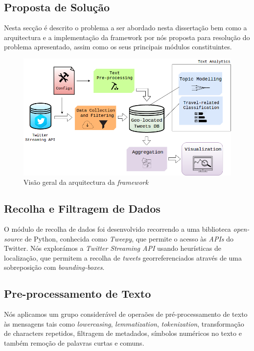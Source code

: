 \documentclass[9pt,a4paper]{extarticle}
\begin{document}
\begin{multicols}{2}
\section{Proposta de Solução}\label{sec:work}

Nesta secção é descrito o problema a ser abordado nesta dissertação bem como a arquitectura e a implementação da framework por nós proposta para resolução do problema apresentado, assim como os seus principais módulos constituintes.

\begin{figure}[H]
\centerline{\includegraphics[scale=.25]{architecture.png}}
\caption{Visão geral da arquitectura da \emph{framework}}  
\label{fig:architecture}
\end{figure}

\subsection{Recolha e Filtragem de Dados}
O módulo de recolha de dados foi desenvolvido recorrendo a uma biblioteca \emph{open-source} de Python, conhecida como \emph{Tweepy}, que permite o acesso às \emph{APIs} do Twitter. Nós explorámos a \emph{Twitter Streaming API} usando heurísticas de localização, que permitem a recolha de \emph{tweets} georreferenciados através de uma sobreposição com \emph{bounding-boxes}.

\subsection{Pre-processamento de Texto}
Nós aplicamos um grupo considerável de operaões de pré-processamento de texto às mensagens tais como \emph{lowercasing}, \emph{lemmatization}, \emph{tokenization}, transformação de characters repetidos, filtragem de metadados, símbolos numéricos no texto e também remoção de palavras curtas e comuns.


\end{multicols}
\end{document}
